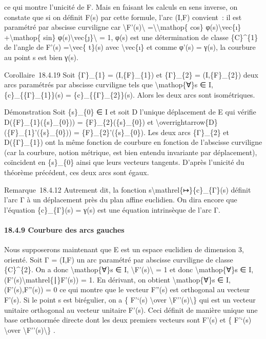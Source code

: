 \documentclass[]{article}
\begin{document}
ce qui montre l'unicité de F. Mais en faisant les calculs en sens
inverse, on constate que si on définit F(s) par cette formule, l'arc
(I,F) convient~: il est paramétré par abscisse curviligne car
\textbackslash{}\textbar{}F'(s)\textbackslash{}\textbar{}
=\textbackslash{}\textbar{}\textbackslash{}mathop\{ cos\}
φ(s)\textbackslash{}vec\{ı\} +\textbackslash{}mathop\{ sin\}
φ(s)\textbackslash{}vec\{ȷ\}\textbackslash{}\textbar{} = 1, φ(s) est une
détermination de classe \{C\}\^{}\{1\} de l'angle de F'(s)
=\textbackslash{}vec\{ t\}(s) avec \textbackslash{}vec\{ı\} et comme
φ'(s) = γ(s), la courbure au point s est bien γ(s).

Corollaire~18.4.19 Soit \{Γ\}\_\{1\} = (I,\{F\}\_\{1\}) et \{Γ\}\_\{2\}
= (I,\{F\}\_\{2\}) deux arcs paramétrés par abscisse curviligne tels que
\textbackslash{}mathop\{∀\}s ∈ I, \{c\}\_\{\{Γ\}\_\{1\}\}(s) =
\{c\}\_\{\{Γ\}\_\{2\}\}(s). Alors les deux arcs sont isométriques.

Démonstration Soit \{s\}\_\{0\} ∈ I et soit D l'unique déplacement de E
qui vérifie D(\{F\}\_\{1\}(\{s\}\_\{0\})) = \{F\}\_\{2\}(\{s\}\_\{0\})
et \textbackslash{}overrightarrow\{D\}(\{F\}\_\{1\}'(\{s\}\_\{0\})) =
\{F\}\_\{2\}'(\{s\}\_\{0\}). Les deux arcs \{Γ\}\_\{2\} et
D(\{Γ\}\_\{1\}) ont la même fonction de courbure en fonction de
l'abscisse curviligne (car la courbure, notion métrique, est bien
entendu invariante par déplacement), coïncident en \{s\}\_\{0\} ainsi
que leurs vecteurs tangents. D'après l'unicité du théorème précédent,
ces deux arcs sont égaux.

Remarque~18.4.12 Autrement dit, la fonction
s\textbackslash{}mathrel\{↦\}\{c\}\_\{Γ\}(s) définit l'arc Γ à un
déplacement près du plan affine euclidien. On dira encore que l'équation
\{c\}\_\{Γ\}(s) = γ(s) est une équation intrinsèque de l'arc Γ.

\paragraph{18.4.9 Courbure des arcs gauches}

Nous supposerons maintenant que E est un espace euclidien de dimension
3, orienté. Soit Γ = (I,F) un arc paramétré par abscisse curviligne de
classe \{C\}\^{}\{2\}. On a donc \textbackslash{}mathop\{∀\}s ∈ I,
\textbackslash{}\textbar{}F'(s)\textbackslash{}\textbar{} = 1 et donc
\textbackslash{}mathop\{∀\}s ∈ I,
(F'(s)\textbackslash{}mathrel\{∣\}F'(s)) = 1. En dérivant, on obtient
\textbackslash{}mathop\{∀\}s ∈ I,(F'(s),F''(s)) = 0 ce qui montre que le
vecteur F''(s) est orthogonal au vecteur F'(s). Si le point s est
birégulier, on a \{ F'`(s) \textbackslash{}over
\textbackslash{}\textbar{}F''(s)\textbackslash{}\textbar{}\} qui est un
vecteur unitaire orthogonal au vecteur unitaire F'(s). Ceci définit de
manière unique une base orthonormée directe dont les deux premiers
vecteurs sont F'(s) et \{ F'`(s) \textbackslash{}over
\textbackslash{}\textbar{}F''(s)\textbackslash{}\textbar{}\} .
\end{document}
